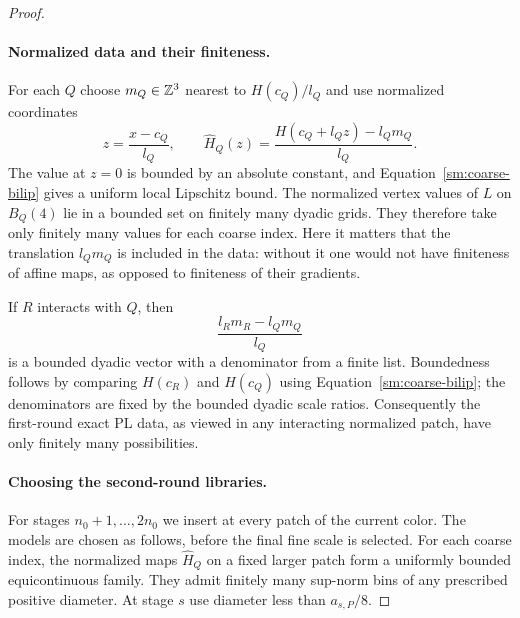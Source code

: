 \begin{proof}
\paragraph{Normalized data and their finiteness.}
For each $Q$ choose $m_Q\in\mathbb Z^3$ nearest to
$H(c_Q)/l_Q$ and use normalized coordinates
\begin{equation}
 \label{sm:normalization}
 z=\frac{x-c_Q}{l_Q},\qquad
 \widehat H_Q(z)=\frac{H(c_Q+l_Qz)-l_Qm_Q}{l_Q}.
\end{equation}
The value at $z=0$ is bounded by an absolute constant,
and Equation~\eqref{sm:coarse-bilip} gives a uniform local
Lipschitz bound.  The normalized vertex values of $L$
on $B_Q(4)$ lie in a bounded set on finitely many
dyadic grids.  They therefore take only finitely many
values for each coarse index.  Here it matters that
the translation $l_Qm_Q$ is included in the data:
without it one would not have finiteness of affine
maps, as opposed to finiteness of their gradients.

If $R$ interacts with $Q$, then
\begin{equation}
 \label{sm:relative-origins}
 \frac{l_Rm_R-l_Qm_Q}{l_Q}
\end{equation}
is a bounded dyadic vector with a denominator from a
finite list.  Boundedness follows by comparing
$H(c_R)$ and $H(c_Q)$ using Equation~\eqref{sm:coarse-bilip};
the denominators are fixed by the bounded dyadic
scale ratios.  Consequently the first-round exact
PL data, as viewed in any interacting normalized
patch, have only finitely many possibilities.

\paragraph{Choosing the second-round libraries.}
For stages $n_0+1,\ldots,2n_0$ we insert at every
patch of the current color.  The models are chosen
as follows, before the final fine scale is selected.
For each coarse index, the normalized maps
$\widehat H_Q$ on a fixed larger patch form a
uniformly bounded equicontinuous family.  They
admit finitely many sup-norm bins of any prescribed
positive diameter.  At stage $s$ use diameter less
than $a_{s,P}/8$.


\end{proof}
